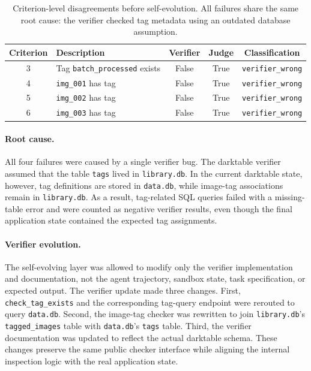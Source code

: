 \documentclass{llmxive}
\begin{document}
\begin{table}[!htbp]
\centering
\small
\begin{tabular}{clccc}
\toprule
Criterion & Description & Verifier & Judge & Classification \\
\midrule
3 & Tag \texttt{batch\_processed} exists & False & True & \texttt{verifier\_wrong} \\
4 & \texttt{img\_001} has tag & False & True & \texttt{verifier\_wrong} \\
5 & \texttt{img\_002} has tag & False & True & \texttt{verifier\_wrong} \\
6 & \texttt{img\_003} has tag & False & True & \texttt{verifier\_wrong} \\
\bottomrule
\end{tabular}
\label{tab:darktable-self-evolving-disagreements}
\caption{
Criterion-level disagreements before self-evolution. All failures share the
same root cause: the verifier checked tag metadata using an outdated database
assumption.
}
\end{table}

\paragraph{Root cause.}
All four failures were caused by a single verifier bug. The darktable verifier
assumed that the table \texttt{tags} lived in \texttt{library.db}. In the current
darktable state, however, tag definitions are stored in \texttt{data.db}, while
image-tag associations remain in \texttt{library.db}. As a result, tag-related
SQL queries failed with a missing-table error and were counted as negative
verifier results, even though the final application state contained the expected
tag assignments.

\paragraph{Verifier evolution.}
The self-evolving layer was allowed to modify only the verifier implementation
and documentation, not the agent trajectory, sandbox state, task specification,
or expected output. The verifier update made three changes. First,
\texttt{check\_tag\_exists} and the corresponding tag-query endpoint were
rerouted to query \texttt{data.db}. Second, the image-tag checker was rewritten
to join \texttt{library.db}'s \texttt{tagged\_images} table with
\texttt{data.db}'s \texttt{tags} table. Third, the verifier documentation was
updated to reflect the actual darktable schema. These changes preserve the same
public checker interface while aligning the internal inspection logic with the
real application state.
\end{document}

